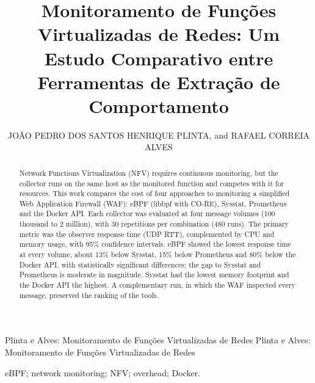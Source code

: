 \documentclass{ieeeaccess}
\begin{document}
\newlength{\xfigwd}  %
\setlength{\xfigwd}{\columnwidth}


\title{Monitoramento de Funções Virtualizadas de Redes: Um Estudo Comparativo entre Ferramentas de Extração de Comportamento}

\author{
\uppercase{João Pedro dos Santos Henrique Plinta}, and
\uppercase{Rafael Correia Alves}}

\address[1]{Instituto Federal do Paraná, Campus Pinhais, Pinhais, PR, Brasil}


\markboth
{Plinta e Alves: Monitoramento de Funções Virtualizadas de Redes}
{Plinta e Alves: Monitoramento de Funções Virtualizadas de Redes}


\begin{abstract}
Network Functions Virtualization (NFV) requires continuous monitoring, but the collector runs on the same host as the monitored function and competes with it for resources. This work compares the cost of four approaches to monitoring a simplified Web Application Firewall (WAF): eBPF (libbpf with CO-RE), Sysstat, Prometheus and the Docker API. Each collector was evaluated at four message volumes (100 thousand to 2 million), with 30 repetitions per combination (480 runs). The primary metric was the observer response time (UDP RTT), complemented by CPU and memory usage, with 95\% confidence intervals. eBPF showed the lowest response time at every volume, about 13\% below Sysstat, 15\% below Prometheus and 80\% below the Docker API, with statistically significant differences; the gap to Sysstat and Prometheus is moderate in magnitude. Sysstat had the lowest memory footprint and the Docker API the highest. A complementary run, in which the WAF inspected every message, preserved the ranking of the tools.
\end{abstract}

\begin{keywords}
eBPF; network monitoring; NFV; overhead; Docker.
\end{keywords}

\titlepgskip=-15pt
\end{document}
